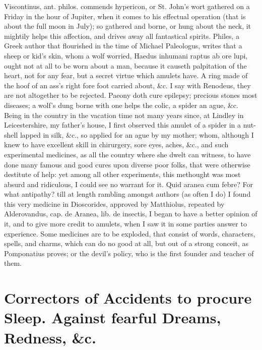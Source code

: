 Viscontinus, ant. philos. commends hypericon, or St. John's wort
gathered on a Friday in the hour of Jupiter, when it comes to his
effectual operation (that is about the full moon in July); so gathered
and borne, or hung about the neck, it mightily helps this affection,
and drives away all fantastical spirits. Philes, a Greek author
that flourished in the time of Michael Paleologus, writes that a sheep
or kid's skin, whom a wolf worried, Haedus inhumani raptus ab ore
lupi, ought not at all to be worn about a man, because it causeth
palpitation of the heart, not for any fear, but a secret virtue which
amulets have. A ring made of the hoof of an ass's right fore foot
carried about, \&c. I say with Renodeus, they are not altogether
to be rejected. Paeony doth cure epilepsy; precious stones most
diseases; a wolf's dung borne with one helps the colic, a
spider an ague, \&c. Being in the country in the vacation time not many
years since, at Lindley in Leicestershire, my father's house, I first
observed this amulet of a spider in a nut-shell lapped in silk, \&c., so
applied for an ague by my mother; whom, although I knew to have
excellent skill in chirurgery, sore eyes, aches, \&c., and such
experimental medicines, as all the country where she dwelt can witness,
to have done many famous and good cures upon diverse poor folks, that
were otherwise destitute of help: yet among all other experiments, this
methought was most absurd and ridiculous, I could see no warrant for
it. Quid aranea cum febre? For what antipathy? till at length rambling
amongst authors (as often I do) I found this very medicine in
Dioscorides, approved by Matthiolus, repeated by Alderovandus, cap. de
Aranea, lib. de insectis, I began to have a better opinion of it, and
to give more credit to amulets, when I saw it in some parties answer to
experience. Some medicines are to be exploded, that consist of words,
characters, spells, and charms, which can do no good at all, but out of
a strong conceit, as Pomponatius proves; or the devil's policy, who is
the first founder and teacher of them.

\section[Correctors for sleep]{Correctors of Accidents to procure Sleep. Against fearful Dreams, Redness, \&c.}

